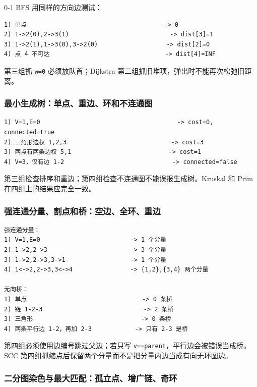 0-1 BFS 用同样的方向边测试：

\begin{lstlisting}
1) 单点                                      -> 0
2) 1->2(0),2->3(1)                            -> dist[3]=1
3) 1->2(1),1->3(0),3->2(0)                   -> dist[2]=0
4) 点 4 不可达                                -> dist[4]=INF
\end{lstlisting}

第三组抓 \passthrough{\lstinline!w=0!} 必须放队首；Dijkstra 第二组抓旧堆项，弹出时不能再次松弛旧距离。

\subsubsection{最小生成树：单点、重边、环和不连通图}

\begin{lstlisting}
1) V=1,E=0                                      -> cost=0, connected=true
2) 三角形边权 1,2,3                             -> cost=3
3) 两点有两条边权 5,1                           -> cost=1
4) V=3，仅有边 1-2                              -> connected=false
\end{lstlisting}

第三组检查排序和重边；第四组检查不连通图不能误报生成树。Kruskal 和 Prim
在四组上的结果应完全一致。

\subsubsection{强连通分量、割点和桥：空边、全环、重边}

\begin{lstlisting}
强连通分量：
1) V=1,E=0                         -> 1 个分量
2) 1->2,2->3                       -> 3 个分量
3) 1->2,2->3,3->1                  -> 1 个分量
4) 1<->2,2->3,3<->4                -> {1,2},{3,4} 两个分量

无向桥：
1) 单点                                -> 0 条桥
2) 链 1-2-3                            -> 2 条桥
3) 三角形                              -> 0 条桥
4) 两条平行边 1-2，再加 2-3            -> 只有 2-3 是桥
\end{lstlisting}

第四组必须使用边编号跳过父边；若只写 \passthrough{\lstinline!v==parent!}，平行边会被错误当成桥。SCC 第四组抓缩点后保留两个分量而不是把分量内边当成有向无环图边。

\subsubsection{二分图染色与最大匹配：孤立点、增广链、奇环}

